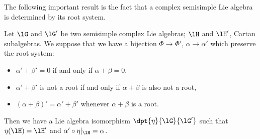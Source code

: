 The following important result is the fact that a complex semisimple Lie algebra is determined by its root system.
\begin{theorem}
	Let $\lG$ and $\lG'$ be two semisimple complex Lie algebras; $\lH$ and $\lH'$, Cartan subalgebras. We suppose that we have a bijection $\Phi\to\Phi'$, $\alpha\to\alpha'$ which preserve the root system:

	\begin{itemize}
		\item $\alpha'+\beta'=0$ if and only if $\alpha+\beta=0$,
		\item $\alpha'+\beta'$ is not a root if and only if $\alpha+\beta$ is also not a root,
		\item $(\alpha+\beta)'=\alpha'+\beta'$ whenever $\alpha+\beta$ is a root.
	\end{itemize}
	Then we have a Lie algebra isomorphism $\dpt{\eta}{\lG}{\lG'}$ such that $\eta(\lH)=\lH'$ and $\alpha'\circ\eta|_{\lH}=\alpha$.
\end{theorem}

